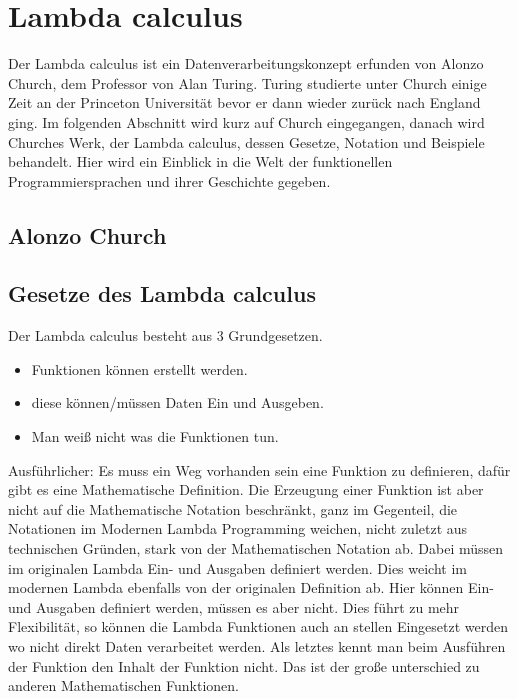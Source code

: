 \section{Lambda calculus}
Der Lambda calculus ist ein Datenverarbeitungskonzept erfunden von Alonzo Church, dem Professor von Alan Turing. Turing studierte unter Church einige Zeit an der Princeton Universität bevor er dann wieder zurück nach England ging. Im folgenden Abschnitt wird kurz auf Church eingegangen, danach wird Churches Werk, der Lambda calculus, dessen Gesetze, Notation und Beispiele behandelt. Hier wird ein Einblick in die Welt der funktionellen Programmiersprachen und ihrer Geschichte gegeben.
\subsection{Alonzo Church}
\subsection{Gesetze des Lambda calculus}
Der Lambda calculus besteht aus 3 Grundgesetzen.
\begin{itemize}
\item Funktionen können erstellt werden.
\item diese können/müssen Daten Ein und Ausgeben.
\item Man weiß nicht was die Funktionen tun.
\end{itemize}
Ausführlicher: Es muss ein Weg vorhanden sein eine Funktion zu definieren, dafür gibt es eine Mathematische Definition. Die Erzeugung einer Funktion ist aber nicht auf die Mathematische Notation beschränkt, ganz im Gegenteil, die Notationen im Modernen Lambda Programming weichen, nicht zuletzt aus technischen Gründen, stark von der Mathematischen Notation ab. Dabei müssen im originalen Lambda Ein- und Ausgaben definiert werden. Dies weicht im modernen Lambda ebenfalls von der originalen Definition ab. Hier können Ein- und Ausgaben definiert werden, müssen es aber nicht. Dies führt zu mehr Flexibilität, so können die Lambda Funktionen auch an stellen Eingesetzt werden wo nicht direkt Daten verarbeitet werden. Als letztes kennt man beim Ausführen der Funktion den Inhalt der Funktion nicht. Das ist der große unterschied zu anderen Mathematischen Funktionen.\cite{lambdacalculus}
